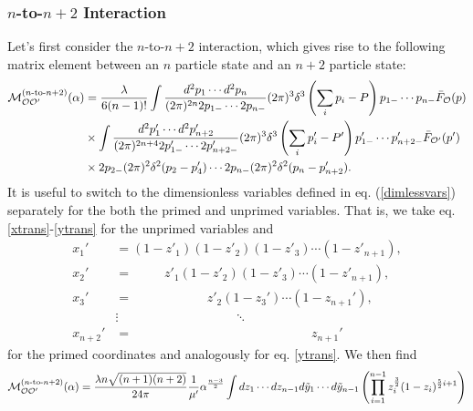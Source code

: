 {\subsubsection{$n$-to-$n+2$ Interaction} Let's first consider the $n$-to-$n+2$ interaction, which gives rise to the following matrix element between an $n$ particle state and an $n+2$ particle state: \begin{equation}
	\begin{aligned}
		{\cal M}^{(n\textrm{-to-}n+2)}_{{\cal O} {\cal O}'}(\alpha) &= \frac{\lambda}{6(n-1)!} \int \frac{d^2 p_1 \dotsb d^2 p_n}{(2\pi)^{2n} 2p_{1-} \dotsb 2p_{n-}} (2\pi)^3 \delta^3 \left(\sum_i p_i - P \right) p_{1-} \dotsb p_{n-} \bar{F}_{{\cal O}}(p) \\
		&\times \int \frac{d^2p_1' \dotsb d^2p_{n+2}'}{(2\pi)^{2n+4} 2p_{1-}' \dotsb 2p'_{n+2-}} (2\pi)^3 \delta^3\left(\sum_i p'_i - P' \right) p'_{1-} \dotsb p'_{n+2-} \bar{F}_{{\cal O}'}(p') \\
		&\times 2p_{2-} (2\pi)^2 \delta^2(p_2 - p'_4) \dotsb 2 p_{n-} (2\pi)^2 \delta^2 (p_n - p'_{n+2}).
	\end{aligned}
\end{equation} It is useful to switch to the dimensionless variables defined in eq. (\ref{dimlessvars}) separately for the both the primed and unprimed variables. That is, we take eq. \eqref{xtrans}-\eqref{ytrans} for the unprimed variables and \begin{equation}
		\begin{aligned}
			x_1' &= (1-z'_1)(1-z'_2)(1-z'_3) \dotsb (1-z'_{n+1}), \\
			x_2' &= \quad\quad\,\,\, z'_1(1-z'_2)(1-z'_3) \dotsb (1-z'_{n+1}), \\
			x_3' &= \quad\quad\,\,\, \quad\quad\quad\,\, z'_2(1-z_3') \dotsb (1-z_{n+1}'), \\
			&\vdots \quad\quad\quad\quad\quad\quad\quad\quad\quad \ddots \\
			x_{n+2}' &= \quad\quad\quad\quad\quad\quad\quad\quad\quad\quad\quad\quad\quad\quad z_{n+1}' \label{xtransprimed}
		\end{aligned}
	\end{equation} for the primed coordinates and analogously for eq. \eqref{ytrans}. We then find \begin{equation}
		\begin{aligned}
			&\Mcal^{(n\textrm{-to-}n+2)}_{\Ocal \Ocal'}(\alpha) = \frac{\lambda n \sqrt{(n+1)(n+2)}}{24 \pi} \frac{1}{\mu'} \alpha^{\frac{n-3}{2}} \int dz_1 \dotsb dz_{n-1}   d\tilde{y}_1 \dotsb d\tilde{y}_{n-1}  \left( \prod_{i=1}^{n-1} z_i^{\frac{3}{2}} (1-z_i)^{\frac{5}{2}i+1} \right)  \\

\end{aligned}
\end{equation}}

